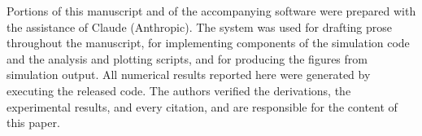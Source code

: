 \documentclass[conference]{IEEEtran}
\begin{document}
%

Portions of this manuscript and of the accompanying software were prepared
with the assistance of Claude (Anthropic). The system was used for drafting
prose throughout the manuscript, for implementing components of the
simulation code and the analysis and plotting scripts, and for producing the
figures from simulation output. All numerical results reported here were
generated by executing the released code. The authors verified the
derivations, the experimental results, and every citation, and are
responsible for the content of this paper.



\end{document}
